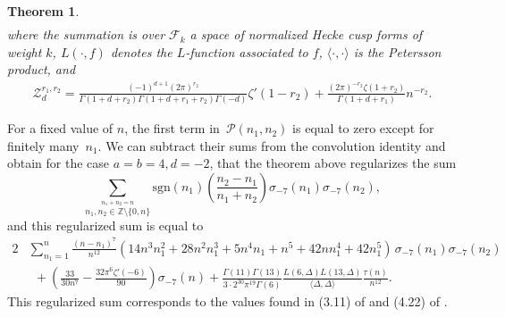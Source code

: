 \documentclass[]{article}
\newtheorem{letterthm}{Theorem}
\begin{document}
\begin{letterthm}
\begin{equation}
\begin{split}
\end{split}
\end{equation}
 where the summation is over  $\mathcal{F}_k$ a space of normalized Hecke  cusp forms of weight $k$, $L(\cdot, f)$ denotes the $L$-function associated to $f$, $\langle \cdot, \cdot \rangle$ is the Petersson product, and 
\begin{equation}
    \begin{split}
\mathcal{Z}^{r_1,r_2}_d =    \frac{(-1)^{d+1} (2 \pi )^{r_2} }{\Gamma (1+d+r_2) \Gamma (1+d+r_1+r_2 )  \Gamma(-d) }  \zeta'(1-r_2) + \frac{(2 \pi )^{-r_2} \zeta (1+r_2 )}{\Gamma (1+d+r_1 )} n^{-r_2}.
    \end{split}
\end{equation}
\end{letterthm}
\vspace{.2cm}


For a fixed value of $n$,  the first term in~$\mathcal{P}(n_1,n_2)$ is equal to zero except for finitely many~$n_1$. We can subtract their sums  from the convolution identity and obtain for the case $a=b=4, d=-2$, that the theorem above regularizes the sum 
\begin{equation}\label{eq:shameless_regularization}
    \sum_{\stackrel{n_1+n_2=n}{n_1, n_2 \in \mathbb{Z} \setminus \{ 0, n\}  } } \text{sgn}(n_1)\left(\frac{n_2-n_1}{n_1+n_2}\right)\sigma_{-7}(n_1) \sigma_{-7}(n_2) ,
\end{equation}
and this regularized sum is equal to 
\begin{equation}\label{eq:shameless_regularization1}
\begin{split}
 2& \sum_{ n_1 =1} ^n \frac{ (n-n_1)^7 }{n^{12}}(14 n^3 n_1^2+28 n^2 n_1^3+5 n^4 n_1+n^5+42 n n_1^4+42 n_1^5)\,\sigma_{-7}(n_1) \sigma_{-7 }(n_2) \\ 
     & \ \   +  \left(\frac{33 }{30 n^7}-\frac{32\pi^6 \zeta '(-6)}{90}\right)\sigma _{-7}(n)    +\frac{ \Gamma (11) \Gamma(13)}{3\cdot 2^{30}\pi ^{19}\Gamma \left(6\right)} \frac{L\left(6,\Delta\right) L\left(13,\Delta\right)}{\langle \Delta, \Delta \rangle }   \frac{\tau(n)}{n^{12}}. 
\end{split}
\end{equation}
This regularized sum corresponds to  the values found in (3.11) of \cite{DKS2021_2} and (4.22) of \cite{DGW}. 
\end{document}
